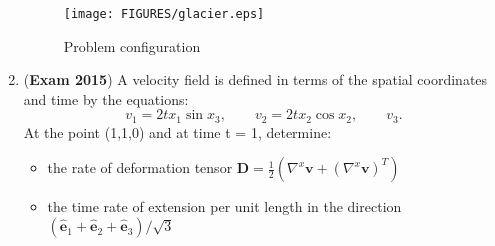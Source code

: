 \documentclass{article}
\newcommand{\ee}{\end{equation}}
\newcommand{\be}{\begin{equation}}
\newcommand{\bi}{\begin{itemize}}
\newcommand{\ei}{\end{itemize}}
\newcommand{\bs}{\boldsymbol}
\newcommand{\tbf}{\textbf}
\newif\ifsolution
\begin{document}
\begin{enumerate}
\begin{figure}[!h]
\centering
  \texttt{[image: FIGURES/glacier.eps]}
 \caption{Problem configuration}
 \label{fig:glacier}
\end{figure}

\ifsolution
\underline{Solution:}

\begin{align}
d\bs X^{(1)} &= 
\begin{pmatrix}
-\frac{1}{2} a_0\\
-\frac{\sqrt{3}}{2} a_0
\end{pmatrix}
&&\textit{Side $AB$}, \\
d\bs X^{(2)} &= 
\begin{pmatrix}
 a_0\\
0
\end{pmatrix}
&&\textit{Side $BC$}, \\
d\bs X^{(3)} &= 
\begin{pmatrix}
-\frac{1}{2} a_0\\
\frac{\sqrt{3}}{2} a_0
\end{pmatrix}
&&\textit{Side $CA$}.
\end{align}

\begin{align}
a_i^2 &= d\bs X^{(i)T} \bs F^T \bs F d \bs X^{(i)} = d\bs X^{(i)T} \bs C d \bs X^{(i)} && \textit{$i$ not summed,} \\
a_1^2 &= dX_i^{(1)} C_{ij}dX_j^{(1)} = \frac{a_0^2}{4} C_{11} + \frac{\sqrt{3}}{2} a_0^2 C_{12} + \frac{3}{4} a_0^2 C_{22}, && \\
a_2^2 &= dX_i^{(2)} C_{ij} dX_j^{(2)} = a_0^2 C_{11}, && \\
a_3^2 &=dX_i^{(3)} C_{ij} dX_j^{(3)} = \frac{a_0^2}{4}C_{11} - \frac{\sqrt{3}}{2}a_0^2 C_{12} + \frac{3}{4}a_0^2 C_{22}.
\end{align}

We thus have 3 linear independent equations with 3 unknowns $C_{11},C_{12}, C_{22}$. Solving for $\bs C$, we can compute $\bs E$ by
\be
\bs C = 2\bs E + \bs I.
\ee
\fi

\item (\tbf{Exam 2015}) A velocity field is defined in terms of the spatial coordinates and time by the
equations:
\be
v_1 = 2tx_1 \sin x_3, \qquad v_2 = 2tx_2 \cos x_2, \qquad v_3.
\ee
At the point (1,1,0) and at time t = 1, determine:
\bi
\item the rate of deformation tensor $\bs D = \frac{1}{2}(\nabla^x \bs v + (\nabla^x \bs v)^T)$
\item the time rate of extension per unit length in the direction $(\hat{\bs e}_1 + \hat{\bs e}_2 + \hat{\bs e}_3)/\sqrt{3}$
\ei


\end{enumerate}
\end{document}
